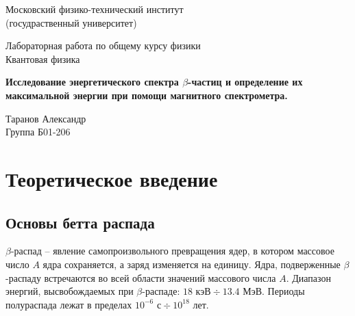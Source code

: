 \documentclass[a4paper, 12pt]{article} %
\begin{document}
	
	\begin{titlepage}
		
		\newpage
		\begin{center}
			\normalsize Московский физико-технический институт \\(госудраственный университет)
		\end{center}
		
		\vspace{6em}
		
		\begin{center}
			\Large Лабораторная работа по общему курсу физики\\Квантовая физика
		\end{center}
		
		\vspace{1em}
		
		\begin{center}
			\Large \textbf{Исследование энергетического спектра $\beta$-частиц и определение их максимальной энергии при помощи магнитного спектрометра.}
		\end{center}
		
		\vspace{2em}
		
		\begin{center}
			\large Таранов Александр \\
			Группа Б01-206
		\end{center}
		
		\vspace{\fill}
		
	\end{titlepage}
	
	
	
	\thispagestyle{empty}
	\newpage
	\tableofcontents
	\newpage
	\setcounter{page}{1}

\section{Теоретическое введение}
	
\subsection{Основы бетта распада}
	
	$\beta$-распад -- явление самопроизвольного превращения ядер, в котором массовое число $A$ ядра сохраняется, а заряд изменяется на единицу. Ядра, подверженные $\beta$-распаду встречаются во всей области значений массового числа $A$. Диапазон энергий, высвобождаемых при $\beta$-распаде: $18 \text{ кэВ} \div 13.4 \text{ МэВ}$. Периоды полураспада лежат в пределах $10^{-6} \text{ с} \div 10^{18} \text{ лет}$.
	
\end{document}
